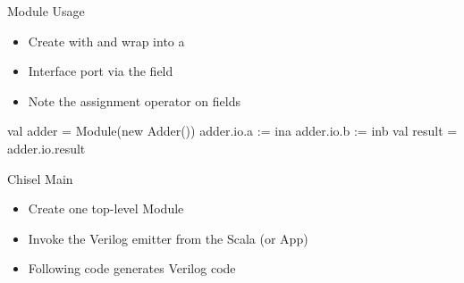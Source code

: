 \begin{frame}[fragile]{Module Usage}
\begin{itemize}
\item Create with  and wrap into a 
\item Interface port via the  field
\item Note the assignment operator \code{:=} on  fields
\end{itemize}
\begin{chisel}
  val adder = Module(new Adder())
  adder.io.a := ina
  adder.io.b := inb
  val result = adder.io.result
\end{chisel}
\end{frame}

%
%
%
%
%

\begin{frame}[fragile]{Chisel Main}

\begin{itemize}
\item Create one top-level Module
\item Invoke the Verilog emitter from the Scala  (or App)
\item Following code generates Verilog code
\end{itemize}
\end{frame}

